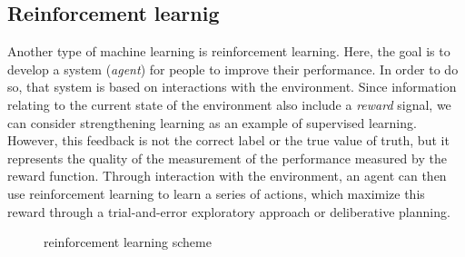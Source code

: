 \subsection{Reinforcement learnig}
\label{subsec:reinforcement-learnig}
Another type of machine learning is reinforcement learning. Here, the goal is to
develop a system (\emph{agent}) for people to improve their performance. 
In order to do so, that system is based on interactions with the environment. 
Since information relating to the current state of the environment also include
a \emph{reward} signal, we can consider strengthening learning as an example of
supervised learning. However, this feedback is not the correct label or the true
value of truth, but it represents the quality of the measurement of the
performance measured by the reward function.
Through interaction with the environment, an agent can then use reinforcement
learning to learn a series of actions, which maximize this reward through a
trial-and-error exploratory approach or deliberative planning.\cite{raschka2016machine}
%
\begin{figure}[!h]
\centering
{} 
\caption{reinforcement learning scheme} 
\label{fig:reinforcement-learning-scheme}
\end{figure}
%

